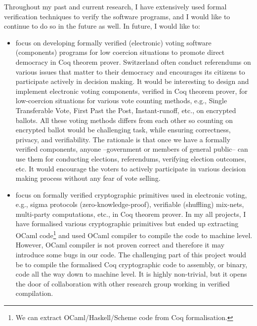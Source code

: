 \documentclass[a4paper]{article}
\begin{document}
Throughout my past and current research, I have extensively used formal verification techniques 
to verify the software programs, and I would like to continue to do so in the future as well. 
In future, I would like to:

\begin{itemize}

\item focus on developing formally verified (electronic) voting software (components) programs 
for low coercion situations to promote direct democracy in Coq theorem prover. Switzerland often 
conduct referendums on various issues that matter to their democracy and encourages its citizens 
to participate actively in decision making. It would be interesting to design and 
implement electronic voting components, verified in Coq theorem prover, for low-coercion 
situations for various vote counting methods, e.g., Single Transferable Vote, First Past the Post, 
Instant-runoff, etc., on encrypted ballots. All these voting methods 
differs from each other so counting on encrypted ballot would be challenging task, while 
ensuring correctness, privacy, and verifiability.  
The rationale is that once we have a formally verified components, anyone --government or 
members of general public-- can use them for conducting elections, referendums, 
verifying election outcomes, etc. It would  encourage the voters to 
actively participate in various decision making process without any fear of vote selling.

\item focus on formally verified cryptographic primitives used in electronic voting, e.g., 
	sigma protocols (zero-knowledge-proof), verifiable (shuffling) mix-nets, 
	multi-party computations, etc., in Coq theorem prover. 
	In my all projects, I have formalised various 
	cryptographic primitives but ended up extracting OCaml code\footnote{We can extract OCaml/Haskell/Scheme 
	code from Coq formalisation.} and used OCaml compiler to 
	compile the code to machine level. However, OCaml compiler is not proven correct 
	and therefore it may introduce some bugs in our code. The challenging part of this project would be 
	to compile the formalised Coq cryptographic code to assembly, or binary, code all the way 
	down to machine level. It is highly non-trivial, but it opens the door of 
	collaboration with other research group working in verified compilation.


\end{itemize}
\end{document}
